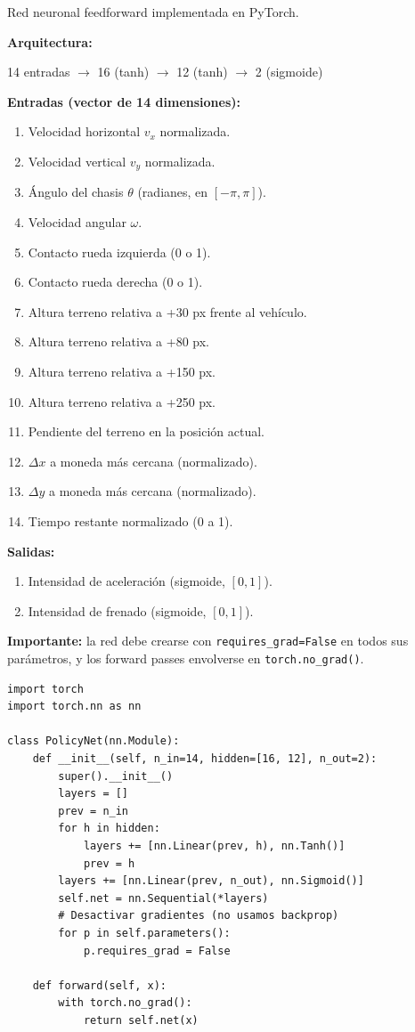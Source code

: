 \documentclass[11pt,a4paper]{article}
\begin{document}
Red neuronal feedforward implementada en PyTorch.

\textbf{Arquitectura:}

\begin{center}
14 entradas $\rightarrow$ 16 (tanh) $\rightarrow$ 12 (tanh) $\rightarrow$ 2 (sigmoide)
\end{center}

\textbf{Entradas (vector de 14 dimensiones):}

\begin{enumerate}
    \item Velocidad horizontal $v_x$ normalizada.
    \item Velocidad vertical $v_y$ normalizada.
    \item Ángulo del chasis $\theta$ (radianes, en $[-\pi, \pi]$).
    \item Velocidad angular $\omega$.
    \item Contacto rueda izquierda (0 o 1).
    \item Contacto rueda derecha (0 o 1).
    \item Altura terreno relativa a +30 px frente al vehículo.
    \item Altura terreno relativa a +80 px.
    \item Altura terreno relativa a +150 px.
    \item Altura terreno relativa a +250 px.
    \item Pendiente del terreno en la posición actual.
    \item $\Delta x$ a moneda más cercana (normalizado).
    \item $\Delta y$ a moneda más cercana (normalizado).
    \item Tiempo restante normalizado (0 a 1).
\end{enumerate}

\textbf{Salidas:}
\begin{enumerate}
    \item Intensidad de aceleración (sigmoide, $[0, 1]$).
    \item Intensidad de frenado (sigmoide, $[0, 1]$).
\end{enumerate}

\textbf{Importante:} la red debe crearse con \texttt{requires\_grad=False} en todos sus parámetros, y los forward passes envolverse en \texttt{torch.no\_grad()}.

\begin{lstlisting}
import torch
import torch.nn as nn

class PolicyNet(nn.Module):
    def __init__(self, n_in=14, hidden=[16, 12], n_out=2):
        super().__init__()
        layers = []
        prev = n_in
        for h in hidden:
            layers += [nn.Linear(prev, h), nn.Tanh()]
            prev = h
        layers += [nn.Linear(prev, n_out), nn.Sigmoid()]
        self.net = nn.Sequential(*layers)
        # Desactivar gradientes (no usamos backprop)
        for p in self.parameters():
            p.requires_grad = False

    def forward(self, x):
        with torch.no_grad():
            return self.net(x)
\end{lstlisting}
\end{document}
